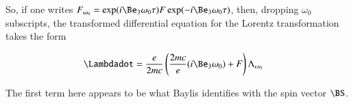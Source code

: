 \documentclass{article}
\begin{document}
So, if one writes $F_{\omega_0} = \exp( i \Be_3 \omega_0 \tau) F \exp( -i \Be_3 \omega_0 \tau)$, then, dropping $\omega_0$ subscripts, the transformed differential equation for the Lorentz transformation takes the form 

\begin{align*}
\Lambdadot
&=
\frac{e}{2 m c} \left(
\frac{2 m c}{e} ( i \Be_3 \omega_0 ) 
+ 
F 
\right)
\Lambda_{\omega_0} 
\end{align*}

The first term here appears to be what Baylis identifies with the spin vector $\BS$.



\end{document}
